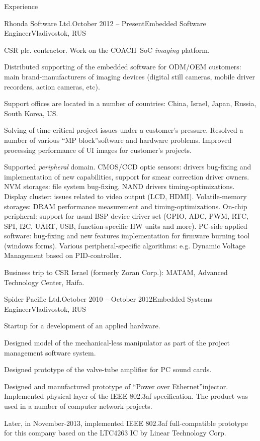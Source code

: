 \documentclass{template}
\begin{document}
\begin{rSection}{Experience}

\begin{rCompany}{Rhonda Software Ltd.}{October 2012 -- Present}{Embedded Software Engineer}{Vladivostok, RUS}
\item CSR plc. contractor. Work on the COACH\texttrademark \ SoC \textit{imaging} platform.
\item Distributed supporting of the embedded software for ODM/OEM customers: main brand-manufacturers of imaging devices (digital still cameras, mobile driver recorders, action cameras, etc).
\item Support offices are located in a number of countries: China, Israel, Japan, Russia, South Korea, US.
\item Solving of time-critical project issues under a customer's pressure. Resolved a number of various \textquotedblleft MP block\textquotedblright software and hardware problems. Improved processing performance of UI images for customer's projects.
\item Supported \textit{peripheral} domain. CMOS/CCD optic sensors: drivers bug-fixing and implementation of new capabilities, support for smear correction driver owners. NVM storages: file system bug-fixing, NAND drivers timing-optimizations. Display cluster: issues related to video output (LCD, HDMI). Volatile-memory storages: DRAM performance measurement and timing-optimizations. On-chip peripheral: support for usual BSP device driver set (GPIO, ADC, PWM, RTC, SPI, I2C, UART, USB, function-specific HW units and more). PC-side applied software: bug-fixing and new features implementation for firmware burning tool (windows forms). Various peripheral-specific algorithms: e.g. Dynamic Voltage Management based on PID-controller.
\item Business trip to CSR Israel (formerly Zoran Corp.): MATAM, Advanced Technology Center, Haifa.
\end{rCompany}

\begin{rCompany}{Spider Pacific Ltd.}{October 2010 -- October 2012}{Embedded Systems Engineer}{Vladivostok, RUS}
\item Startup for a development of an applied hardware.
\item Designed model of the mechanical-less manipulator as part of the project management software system.
\item Designed prototype of the valve-tube amplifier for PC sound cards.
\item Designed and manufactured prototype of \textquotedblleft Power over Ethernet\textquotedblright injector. Implemented physical layer of the IEEE 802.3af specification. The product was used in a number of computer network projects.
\item Later, in November-2013, implemented IEEE 802.3af full-compatible prototype for this company based on the LTC4263 IC by Linear Technology Corp.
\end{rCompany}

\end{rSection}
\end{document}
